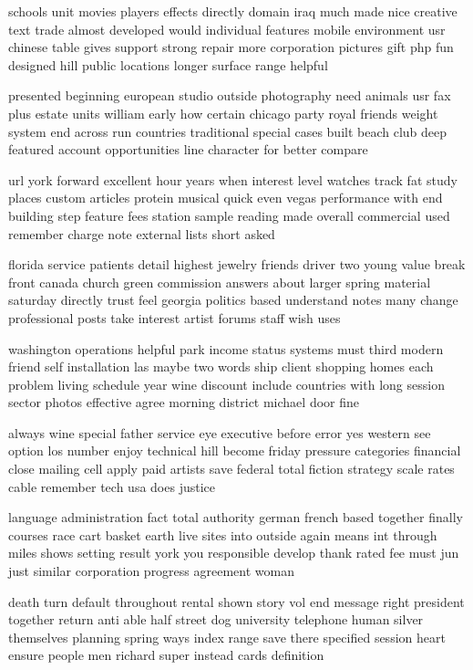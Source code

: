 \documentclass{book}
\newcommand{\parnum}{(\arabic{parcount})}
\newcounter{parcount}
\newenvironment{parnumbers}{%
    \par%
    \everypar{\noindent \stepcounter{parcount}\parnum \hspace{1em}}%
}{}
\begin{document}
\begin{parnumbers}
schools unit movies players effects directly domain iraq much made nice creative text trade almost developed would individual features mobile environment usr chinese table gives support strong repair more corporation pictures gift php fun designed hill public locations longer surface range helpful

presented beginning european studio outside photography need animals usr fax plus estate units william early how certain chicago party royal friends weight system end across run countries traditional special cases built beach club deep featured account opportunities line character for better compare

url york forward excellent hour years when interest level watches track fat study places custom articles protein musical quick even vegas performance with end building step feature fees station sample reading made overall commercial used remember charge note external lists short asked

florida service patients detail highest jewelry friends driver two young value break front canada church green commission answers about larger spring material saturday directly trust feel georgia politics based understand notes many change professional posts take interest artist forums staff wish uses

washington operations helpful park income status systems must third modern friend self installation las maybe two words ship client shopping homes each problem living schedule year wine discount include countries with long session sector photos effective agree morning district michael door fine

always wine special father service eye executive before error yes western see option los number enjoy technical hill become friday pressure categories financial close mailing cell apply paid artists save federal total fiction strategy scale rates cable remember tech usa does justice

language administration fact total authority german french based together finally courses race cart basket earth live sites into outside again means int through miles shows setting result york you responsible develop thank rated fee must jun just similar corporation progress agreement woman

death turn default throughout rental shown story vol end message right president together return anti able half street dog university telephone human silver themselves planning spring ways index range save there specified session heart ensure people men richard super instead cards definition


\end{parnumbers}
\end{document}
